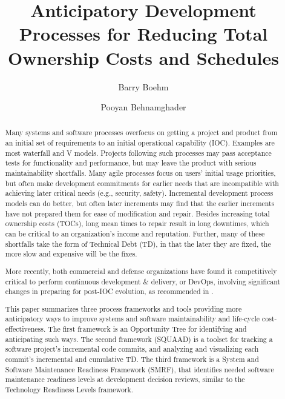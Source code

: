 \documentclass[alpha-refs]{wiley-article}
\title{Anticipatory Development Processes for Reducing Total Ownership Costs and Schedules}
\author[1]{Barry Boehm}
\author[1]{Pooyan Behnamghader}
\affil[1]{Computer Science Deparment, University of Southern California, Los Angeles, California, 90007, USA}
\begin{document}
\maketitle

\begin{abstract}
Many systems and software processes overfocus on getting a project and product from an initial set of requirements to an initial operational capability (IOC).  Examples are most waterfall and V models.  Projects following such processes may pass acceptance tests for functionality and performance, but may leave the product with serious maintainability shortfalls.  Many agile processes focus on users' initial usage priorities, but often make development commitments for earlier needs that are incompatible with achieving later critical needs (e.g., security, safety).  Incremental development process models can do better, but often later increments may find that the earlier increments have not prepared them for ease of modification and repair.  Besides increasing total ownership costs (TOCs), long mean times to repair result in long downtimes, which can be critical to an organization's income and reputation.  Further, many of these shortfalls take the form of Technical Debt (TD), in that the later they are fixed, the more
slow and 
expensive will be the fixes. 

More recently, both commercial and defense organizations have found it competitively critical to perform continuous development \& delivery, or DevOps, involving significant changes in preparing for post-IOC evolution, as recommended in \cite{DefenseScienceBoard}.

This paper summarizes three process frameworks and tools providing more anticipatory ways to improve systems and software maintainability and life-cycle cost-effectiveness.  The first framework is an Opportunity Tree for identifying and anticipating such ways. 
The second framework (SQUAAD) is a toolset for tracking a software project's incremental code commits, and analyzing and visualizing each commit's incremental and cumulative TD.
The third framework is a System and Software Maintenance Readiness Framework (SMRF), that identifies needed software maintenance readiness levels at development decision reviews, similar to the Technology Readiness Levels framework.


\end{abstract}
\end{document}
